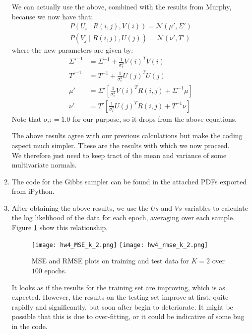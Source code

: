 \documentclass{harvardml}
\newcommand{\N}{\mathcal{N}}
\theoremstyle{plain}
\begin{document}
\begin{enumerate}
We can actually use the above, combined with the results from Murphy, because we now have that:
\begin{align*}
P(U_i \mid R(i,j), V(i)) = \N(\mu', \Sigma') \\
P(V_j \mid R(i,j), U(j)) = \N(\nu', T')
\end{align*}
where the new parameters are given by:
\begin{align*}
\Sigma'^{-1} &= \Sigma^{-1} + \frac{1}{\sigma_{\epsilon}^2}V(i)^TV(i) \\
T'^{-1} &= T^{-1} + \frac{1}{\sigma_{\epsilon}^2}U(j)^TU(j) \\
\mu' &= \Sigma'\left[\frac{1}{\sigma_{\epsilon}^2}V(i)^TR(i,j) +  \Sigma^{-1}\mu \right] \\
\nu' &= T'\left[\frac{1}{\sigma_{\epsilon}^2}U(j)^TR(i,j) +  T^{-1}\nu \right]
\end{align*}
Note that $\sigma_{\epsilon^2} = 1.0$ for our purpose, so it drops from the above equations.

The above results agree with our previous calculations but make the coding aspect much simpler. These are the results with which we now proceed. \\

We therefore just need to keep tract of the mean and variance of some multivariate normals.


\item The code for the Gibbs sampler can be found in the attached PDFs exported from iPython.

\item
After obtaining the above results, we use the $Us$ and $Vs$ variables to calculate the log likelihood of the data for each epoch, averaging over each sample. Figure \ref{fig:log_likelihood} show this relationship.

\begin{figure}[h!]
\centering
\texttt{[image: hw4\_MSE\_k\_2.png]}
\texttt{[image: hw4\_rmse\_k\_2.png]}
\caption{MSE and RMSE plots on training and test data for $K=2$ over $100$ epochs.}
\label{fig:log_likelihood}
\end{figure}


It looks as if the results for the training set are improving, which is as expected. However, the results on the testing set improve at first, quite rapidly and significantly, but soon after begin to deteriorate. It might be possible that this is due to over-fitting, or it could be indicative of some bug in the code.


\end{enumerate}
\end{document}
